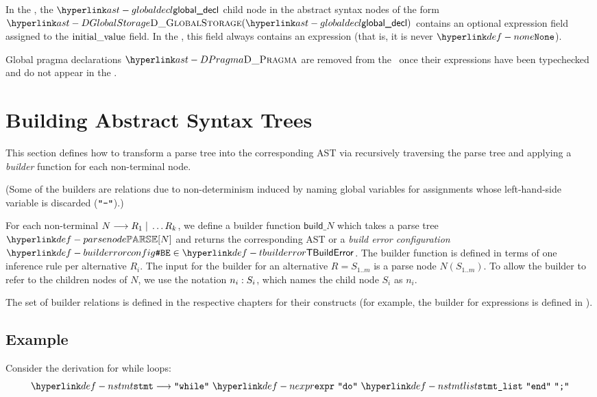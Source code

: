In the \untypedast, the $\globaldecl$ child node in the abstract syntax nodes of the form $\DGlobalStorage(\globaldecl)$
contains an optional expression field assigned to the $\text{initial\_value}$ field. In the \typedast, this field
always contains an expression (that is, it is never $\None$).

Global pragma declarations $\DPragma$ are removed from the \untypedast\ once their expressions have been typechecked and do not appear in the \typedast.

\section{Building Abstract Syntax Trees\label{sec:BuildingAbstractSyntaxTrees}}
This section defines how to transform a parse tree into the corresponding AST
via recursively traversing the parse tree and applying a \emph{builder} function
for each non-terminal node.

(Some of the builders are relations due to non-determinism induced by naming global variables
for assignments whose left-hand-side variable is discarded ($\texttt{"}\texttt{-}\texttt{"}$).)

\hypertarget{def-tbuilderror}{}
\hypertarget{def-builderrorconfig}{}
For each non-terminal $N \longrightarrow R_1 \;|\; \ldots R_k$, we define a builder function
$\textsf{build\_}N $ which takes a parse tree $\parsenode{N}$ and returns the corresponding
AST or a \emph{build error configuration} $\BuildErrorConfig \in \TBuildError$.
The builder function is defined in terms of one inference rule per alternative $R_i$.
The input for the builder for an alternative $R = S_{1..m}$ is a parse node
$N(S_{1..m})$. To allow the builder to refer to the children nodes of $N$,
we use the notation $n_i:S_i$, which names the child node $S_i$ as $n_i$.

The set of builder relations is defined in the respective chapters for their constructs
(for example, the builder for expressions is defined in ).

\subsection{Example}
Consider the derivation for while loops:
\[
\Nstmt \derives \Twhile \parsesep \Nexpr \parsesep \Tdo \parsesep \Nstmtlist \parsesep \Tend \parsesep \Tsemicolon
\]

